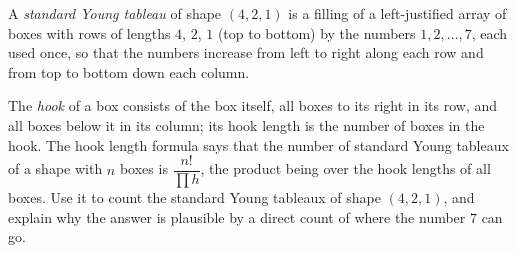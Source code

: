 A \emph{standard Young tableau} of shape $(4,2,1)$ is a filling of a left-justified array of boxes with rows of lengths $4$, $2$, $1$ (top to bottom) by the numbers $1,2,\dots,7$, each used once, so that the numbers increase from left to right along each row and from top to bottom down each column.

The \emph{hook} of a box consists of the box itself, all boxes to its right in its row, and all boxes below it in its column; its hook length is the number of boxes in the hook. The hook length formula says that the number of standard Young tableaux of a shape with $n$ boxes is $\dfrac{n!}{\prod h}$, the product being over the hook lengths of all boxes. Use it to count the standard Young tableaux of shape $(4,2,1)$, and explain why the answer is plausible by a direct count of where the number $7$ can go.
